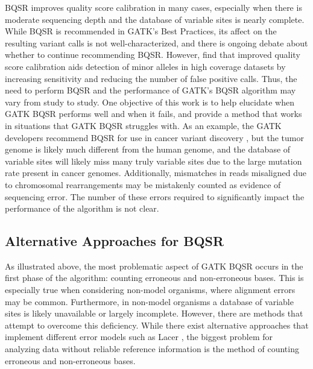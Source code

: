 BQSR improves quality score calibration in many cases, especially when there is moderate sequencing depth and the database of variable sites is nearly complete. %
While BQSR is recommended in GATK's Best Practices, its affect on the resulting variant calls is not well-characterized, and there is ongoing debate about whether to continue recommending BQSR. \parencite{van_der_auwera_geraldine_2020, van_der_auwera_geraldine_2020_b}
However, \cite{ni_improvement_2016} find that improved quality score calibration aids detection of minor alleles in high coverage datasets by increasing sensitivity and reducing the number of false positive calls.
Thus, the need to perform BQSR and the performance of GATK's BQSR algorithm may vary from study to study.
One objective of this work is to help elucidate when GATK BQSR performs well and when it fails, and provide a method that works in situations that GATK BQSR struggles with.
As an example, the GATK developers recommend BQSR for use in cancer variant discovery \parencite{cibulskis_sensitive_2013}, but the tumor genome is likely much different from the human genome, and the database of variable sites will likely miss many truly variable sites due to the large mutation rate present in cancer genomes. Additionally, mismatches in reads misaligned due to chromosomal rearrangements may be mistakenly counted as evidence of sequencing error. The number of these errors required to significantly impact the performance of the algorithm is not clear.

\subsection{Alternative Approaches for BQSR}
As illustrated above, the most problematic aspect of GATK BQSR occurs in the first phase of the algorithm: counting erroneous and non-erroneous bases. This is especially true when considering non-model organisms, where alignment errors may be common. Furthermore, in non-model organisms a database of variable sites is likely unavailable or largely incomplete. However, there are methods that attempt to overcome this deficiency. While there exist alternative approaches that implement different error models such as Lacer \parencite{chung_lacer:_2017}, the biggest problem for analyzing data without reliable reference information is the method of counting erroneous and non-erroneous bases.

